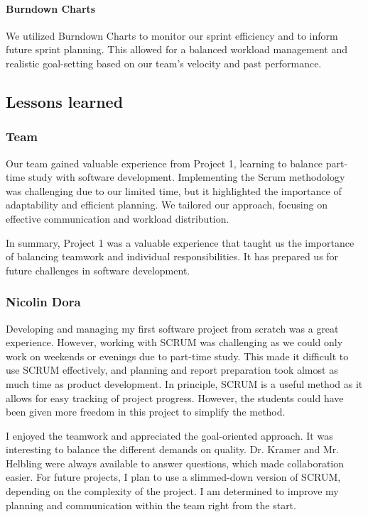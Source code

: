 \paragraph{Burndown Charts}
We utilized Burndown Charts to monitor our sprint efficiency and to inform future sprint planning.
This allowed for a balanced workload management and realistic goal-setting based on our team's velocity and past performance.
\clearpage

\subsection{Lessons learned}

\subsubsection{Team}
Our team gained valuable experience from Project 1, learning to balance part-time study with software development. Implementing the Scrum methodology was challenging due to our limited time, but it highlighted the importance of adaptability and efficient planning. We tailored our approach, focusing on effective communication and workload distribution.

In summary, Project 1 was a valuable experience that taught us the importance of balancing teamwork and individual responsibilities. It has prepared us for future challenges in software development.

\subsubsection{Nicolin Dora}
Developing and managing my first software project from scratch was a great experience.
However, working with SCRUM was challenging as we could only work on weekends or evenings due to part-time study.
This made it difficult to use SCRUM effectively, and planning and report preparation took almost as much time as product development.
In principle, SCRUM is a useful method as it allows for easy tracking of project progress.
However, the students could have been given more freedom in this project to simplify the method.

I enjoyed the teamwork and appreciated the goal-oriented approach.
It was interesting to balance the different demands on quality.
Dr. Kramer and Mr. Helbling were always available to answer questions, which made collaboration easier.
For future projects, I plan to use a slimmed-down version of SCRUM, depending on the complexity of the project.
I am determined to improve my planning and communication within the team right from the start.

